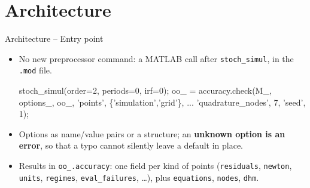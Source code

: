 \documentclass[11pt,aspectratio=169]{beamer}
\newcommand{\code}[1]{\texttt{#1}}
\begin{document}
\section{Architecture}

\begin{frame}[fragile]{Architecture -- Entry point}

\begin{itemize}

\item No new preprocessor command: a MATLAB call after \code{stoch\_simul}, in the \code{.mod} file.

 \medskip
  
\begin{semiverbatim}\footnotesize
stoch_simul(order=2, periods=0, irf=0);
oo_ = accuracy.check(M_, options_, oo_, 'points', \{'simulation','grid'\}, ...
                     'quadrature_nodes', 7, 'seed', 1);
\end{semiverbatim}

\medskip
 
\item Options as name/value pairs or a structure; an \textbf{unknown option is an error}, so that a typo cannot silently leave a default in place.\newline

\item Results in \code{oo\_.accuracy}: one field per kind of points (\code{residuals}, \code{newton}, \code{units}, \code{regimes}, \code{eval\_failures}, \dots), plus \code{equations}, \code{nodes}, \code{dhm}.

\end{itemize}

\end{frame}
\end{document}
